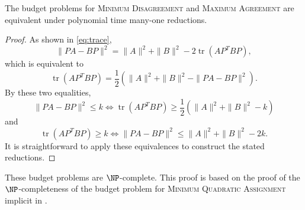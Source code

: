 \documentclass{article}
\newcommand{\1}{\mathbf{1}}
\newcommand{\MD}{\textsc{Minimum Disagreement}}
\renewcommand{\MA}{\textsc{Maximum Agreement}}
\DeclareMathOperator{\tr}{tr}
\begin{document}
\begin{theorem}
  The budget problems for \MD{} and \MA{} are equivalent under polynomial time many-one reductions.
\end{theorem}
\begin{proof}
  As shown in \autoref{eq:trace},
  \begin{equation*}
    \|PA - BP\|^2 = \|A\|^2 + \|B\|^2 - 2 \tr(AP^TBP),
  \end{equation*}
  which is equivalent to
  \begin{equation*}
    \tr(AP^TBP) = \frac{1}{2} (\|A\|^2 + \|B\|^2 - \|PA - BP\|^2).
  \end{equation*}
  By these two equalities,
  \begin{equation*}
    \|PA - BP\|^2 \leq k \iff \tr(AP^TBP) \geq \frac{1}{2} (\|A\|^2 + \|B\|^2 - k)
  \end{equation*}
  and
  \begin{equation*}
    \tr(AP^TBP) \geq k \iff \|PA - BP\|^2 \leq \|A\|^2 + \|B\|^2 - 2k.
  \end{equation*}
  It is straightforward to apply these equivalences to construct the stated reductions.
\end{proof}

These budget problems are $\NP$-complete.
This proof is based on the proof of the $\NP$-completeness of the budget problem for \textsc{Minimum Quadratic Assignment} implicit in \autocite{sg76}.
\end{document}
